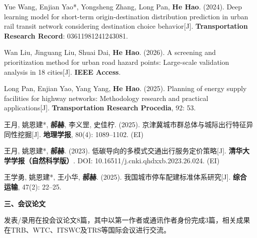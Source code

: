 \begin{enumerate}[leftmargin=*, parsep=5pt, label={[\arabic*]}]
	\item Yue Wang, Enjian Yao*, Yongsheng Zhang, Long Pan, \textbf{He Hao}. (2024). Deep learning model for short-term origin-destination distribution prediction in urban rail transit network considering destination choice behavior[J]. \textbf{Transportation Research Record}: 03611981241243081.

	\item Wan Liu, Jinguang Liu, Shuai Dai, \textbf{He Hao}. (2026). A screening and prioritization method for urban road hazard points: Large-scale validation analysis in 18 cities[J]. \textbf{IEEE Access}.
	
	\item Long Pan, Enjian Yao, Yang Yang, \textbf{He Hao}. (2025). Planning of energy supply facilities for highway networks: Methodology research and practical applications[J]. \textbf{Transportation Research Procedia}, 92: 53.

	\item 王月, 姚恩建*, \textbf{郝赫}, 李义罡, 史佳柠. (2025). 京津冀城市群总体与城际出行特征异同性挖掘[J]. \textbf{地理学报}, 80(4): 1089--1102. (EI)

	\item 王月, 姚恩建*, \textbf{郝赫}. (2023). 低碳导向的多模式交通出行服务定价策略[J]. \textbf{清华大学学报（自然科学版）}. DOI: 10.16511/j.cnki.qhdxxb.2023.26.024. (EI)

	\item 王学勇, 姚恩建*, 王小华, \textbf{郝赫}. (2025). 我国城市停车配建标准体系研究[J]. \textbf{综合运输}, 47(2): 22--25.
	
\end{enumerate}

\vspace{10pt}
\textbf{三、会议论文}
\vspace{5pt}

发表/录用在投会议论文8篇，其中以第一作者或通讯作者身份完成3篇，相关成果在TRB、WTC、ITSWC及TRS等国际会议进行交流。
	
